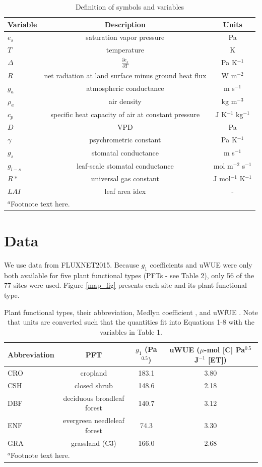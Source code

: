 \documentclass[draft,linenumbers]{agujournal}
\begin{document}
\begin{table}
\caption{Definition of symbols and variables}
\centering
\begin{tabular}{l c c}
\hline
 Variable & Description & Units  \\
\hline
$e_s$  & saturation vapor pressure & Pa  \\ 
$T$  & temperature  & K \\
$\Delta$  & $\frac{\partial e_s}{\partial T}$ & Pa K$^{-1}$ \\
$R$  & net radiation at land surface minus ground heat flux & W m$^{-2}$   \\
  $g_a$  & atmospheric conductance & m s$^{-1}$  \\
  $\rho_a$  & air density & kg m$^{-3}$  \\
  $c_p$  & specific heat capacity of air at constant pressure & J K$^{-1}$ kg$^{-1}$ \\
  $D$  & VPD & Pa  \\
  $\gamma$  & psychrometric constant & Pa K$^{-1}$   \\
  $g_s$  & stomatal conductance & m s$^{-1}$  \\
  $g_{l-s}$  & leaf-scale stomatal conductance & mol m$^{-2}$ s$^{-1}$  \\
  $R*$ & universal gas constant & J mol$^{-1}$ K$^{-1}$ \\
  $LAI$ & leaf area idex & -\\
\hline
\multicolumn{2}{l}{$^{a}$Footnote text here.}
\end{tabular}
\end{table}


\section{Data}

We use data from FLUXNET2015. Because $g_1$ coefficients \citep{Lin_2015} and uWUE were only both available for five plant functional types (PFTs - see Table 2),  only 56 of the 77 sites were used. Figure \ref{map_fig} presents each site and its plant functional type.


\begin{table}
\caption{Plant functional types, their abbreviation, Medlyn coefficient \citep[from ][]{Lin_2015}, and uWfUE \citep[from ][]{Zhou_2015}. Note that units are converted such that the quantities fit into Equations 1-8 with the variables in Table 1.}
\centering
\begin{tabular}{l c c c}
  \hline
  Abbreviation & PFT & $g_1$ (Pa$^{0.5}$) & uWUE ($\mu$-mol [C] Pa$^{0.5}$ J$^{-1}$ [ET])  \\
  \hline
  CRO & cropland & 183.1 & 3.80 \\
  CSH & closed shrub & 148.6 & 2.18 \\
  DBF & deciduous broadleaf forest & 140.7 & 3.12 \\
  ENF & evergreen needleleaf forest & 74.3 & 3.30 \\
  GRA & grassland (C3) & 166.0 & 2.68 \\
\hline
\multicolumn{2}{l}{$^{a}$Footnote text here.}
\end{tabular}
\end{table}
\end{document}
